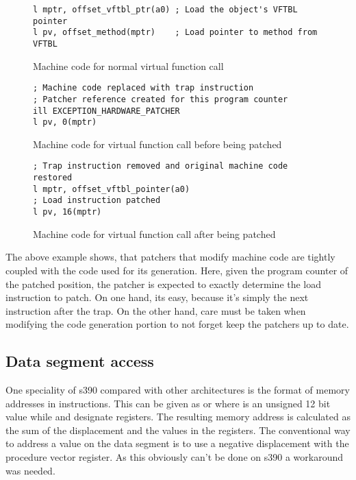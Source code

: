 \begin{figure}
\begin{verbatim}
l mptr, offset_vftbl_ptr(a0) ; Load the object's VFTBL pointer
l pv, offset_method(mptr)    ; Load pointer to method from VFTBL
\end{verbatim}
\caption{Machine code for normal virtual function call}
\label{s390:fig:patch1}
\end{figure}

\begin{figure}
\begin{verbatim}
; Machine code replaced with trap instruction
; Patcher reference created for this program counter
ill EXCEPTION_HARDWARE_PATCHER
l pv, 0(mptr)
\end{verbatim}
\caption{Machine code for virtual function call before being patched}
\label{s390:fig:patch2}
\end{figure}

\begin{figure}
\begin{verbatim}
; Trap instruction removed and original machine code restored
l mptr, offset_vftbl_pointer(a0)
; Load instruction patched
l pv, 16(mptr)
\end{verbatim}
\caption{Machine code for virtual function call after being patched}
\label{s390:fig:patch3}
\end{figure}

The above example shows, that patchers that modify machine code are tightly coupled with the code used for its generation. Here, given the program counter of the patched position, the patcher is expected to exactly determine the load instruction to patch. On one hand, its easy, because it's simply the next instruction after the trap. On the other hand, care must be taken when modifying the code generation portion to not forget keep the patchers up to date.

\subsection{Data segment access}

One speciality of s390 compared with other architectures is the format of memory addresses in instructions. This can be given as  or  where  is an unsigned 12 bit value while  and  designate registers. The resulting memory address is calculated as the sum of the displacement and the values in the registers. The conventional way to address a value on the data segment is to use a negative displacement with the procedure vector register. As this obviously can't be done on s390 a workaround was needed. \\

